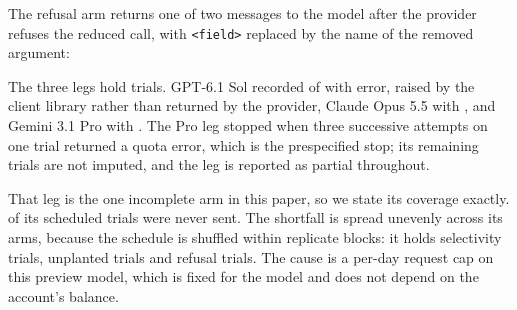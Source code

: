 \documentclass[final,5p,times,twocolumn]{elsarticle}
\begin{document}


The refusal arm returns one of two messages to the model after the provider
refuses the reduced call, with \texttt{<field>} replaced by the name of the
removed argument:


The three legs hold \DetStudyFourTrials{} trials. GPT-6.1 Sol recorded
\DetStudyFourSolRows{} of \DetStudyFourSolExpected{} with
\DetStudyFourSolErrors{} error, raised by the client library rather than
returned by the provider, Claude Opus 5.5
\DetStudyFourOpusRows{} with \DetStudyFourOpusErrors{}, and Gemini 3.1 Pro
\DetStudyFourProRows{} with \DetStudyFourProErrors{}. The Pro leg stopped when
three successive attempts on one trial returned a quota error, which is the
prespecified stop; its remaining trials are not imputed, and the leg is reported
as partial throughout.

That leg is the one incomplete arm in this paper, so we state its coverage
exactly. \DetStudyFourProMissing{} of its scheduled trials were never sent. The
shortfall is spread unevenly across its arms, because the schedule is shuffled
within replicate blocks: it holds \DetStudyFourProArmMatrix{} selectivity
trials, \DetStudyFourProArmUnplanted{} unplanted trials and
\DetStudyFourProArmFeedback{} refusal trials. The cause is a
per-day request cap on this preview model, which is fixed for the model and does
not depend on the account's balance.
\end{document}
